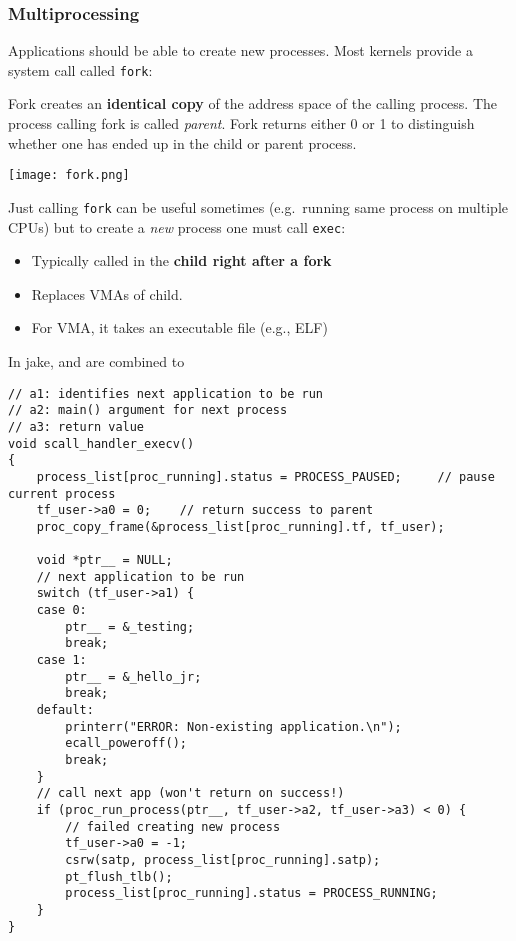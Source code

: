 \subsubsection{Multiprocessing}
Applications should be able to create new processes. Most kernels provide a system call called \texttt{fork}:

\newpar{}

Fork creates an \textbf{identical copy} of the address space of the calling process. The process calling fork is called \textit{parent}. Fork returns either 0 or 1 to distinguish whether one has ended up in the child or parent process.
\begin{center}
    \texttt{[image: fork.png]}
\end{center}

Just calling \texttt{fork} can be useful sometimes (e.g.\ running same process on multiple CPUs) but to create a \textit{new} process one must call \texttt{exec}:

\begin{itemize}
    \item Typically called in the \textbf{child right after a fork}
    \item Replaces VMAs of child.
    \item For  VMA, it takes an executable file (e.g., ELF)
\end{itemize}

\newpar{}

In jake,  and  are combined to 
\begin{lstlisting}[style=bright_C++]
// a1: identifies next application to be run
// a2: main() argument for next process
// a3: return value
void scall_handler_execv()
{
    process_list[proc_running].status = PROCESS_PAUSED;     // pause current process
    tf_user->a0 = 0;    // return success to parent                                    
    proc_copy_frame(&process_list[proc_running].tf, tf_user);

    void *ptr__ = NULL;
    // next application to be run
    switch (tf_user->a1) {
    case 0:
        ptr__ = &_testing;
        break;
    case 1:
        ptr__ = &_hello_jr;
        break;
    default:
        printerr("ERROR: Non-existing application.\n");
        ecall_poweroff();
        break;
    }
    // call next app (won't return on success!)
    if (proc_run_process(ptr__, tf_user->a2, tf_user->a3) < 0) {
        // failed creating new process
        tf_user->a0 = -1;
        csrw(satp, process_list[proc_running].satp);
        pt_flush_tlb();
        process_list[proc_running].status = PROCESS_RUNNING;
    }
}
\end{lstlisting}

